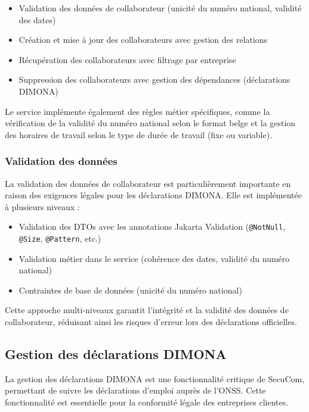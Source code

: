 \documentclass[12pt,a4paper]{report}
\begin{document}
\begin{itemize}
  \item Validation des données de collaborateur (unicité du numéro national, validité des dates)
  \item Création et mise à jour des collaborateurs avec gestion des relations
  \item Récupération des collaborateurs avec filtrage par entreprise
  \item Suppression des collaborateurs avec gestion des dépendances (déclarations DIMONA)
\end{itemize}

Le service implémente également des règles métier spécifiques, comme la vérification de la validité du numéro national selon le format belge et la gestion des horaires de travail selon le type de durée de travail (fixe ou variable).

\subsubsection{Validation des données}

La validation des données de collaborateur est particulièrement importante en raison des exigences légales pour les déclarations DIMONA. Elle est implémentée à plusieurs niveaux :

\begin{itemize}
  \item Validation des DTOs avec les annotations Jakarta Validation (\texttt{@NotNull}, \texttt{@Size}, \texttt{@Pattern}, etc.)
  \item Validation métier dans le service (cohérence des dates, validité du numéro national)
  \item Contraintes de base de données (unicité du numéro national)
\end{itemize}

Cette approche multi-niveaux garantit l'intégrité et la validité des données de collaborateur, réduisant ainsi les risques d'erreur lors des déclarations officielles.

\subsection{Gestion des déclarations DIMONA}

La gestion des déclarations DIMONA est une fonctionnalité critique de SecuCom, permettant de suivre les déclarations d'emploi auprès de l'ONSS. Cette fonctionnalité est essentielle pour la conformité légale des entreprises clientes.
\end{document}
